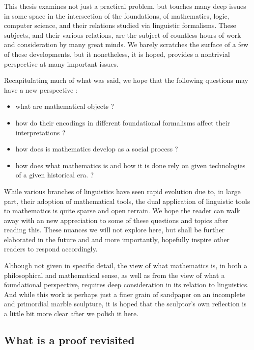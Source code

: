 This thesis examines not just a practical problem, but touches many deep issues
in some space in the intersection of the foundations, of mathematics, logic,
computer science, and their relations studied via linguistic formalisms. These
subjects, and their various relations, are the subject of countless hours of
work and consideration by many great minds. We barely scratches the surface of a
few of these developments, but it nonetheless, it is hoped, provides a
nontrivial perspective at many important issues.

Recapitulating much of what was said, we hope that the following questions may
have a new perspective :

\begin{itemize}

\item what are mathematical objects ?
\item how do their encodings in different foundational formalisms affect their
  interpretations ?
\item how does is mathematics develop as a social process ?
\item how does what mathematics is and how it is done rely on given technologies
  of a given historical era. ?
  
\end{itemize}

While various branches of linguistics have seen rapid evolution due to, in large
part, their adoption of mathematical tools, the dual application of linguistic
tools to mathematics is quite sparse and open terrain. We hope the reader can
walk away with an new appreciation to some of these questions and topics after
reading this. These nuances we will not explore here, but shall be further
elaborated in the future and and more importantly, hopefully inspire other
readers to respond accordingly.

Although not given in specific detail, the view of what mathematics is, in both
a philosophical and mathematical sense, as well as from the view of what a
foundational perspective, requires deep consideration in its relation to
linguistics. And while this work is perhaps just a finer grain of sandpaper on
an incomplete and primordial marble sculpture, it is hoped that the sculptor's
own reflection is a little bit more clear after we polish it here.

\subsection{What is a proof revisited}

